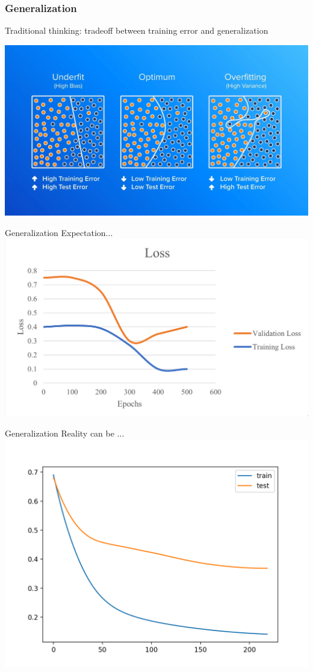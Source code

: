 \documentclass{beamer}   	%
\theoremstyle{definition}
\begin{document}
\begin{frame}
\frametitle{Generalization}
Traditional thinking: tradeoff between training error and generalization

\includegraphics[width=\linewidth]{fit}
\end{frame}

\begin{frame}{Generalization}
Expectation...
\includegraphics[width=\linewidth]{loss_curve_expected.png}
\end{frame}

\begin{frame}{Generalization}
Reality can be ...
\includegraphics[width=\linewidth]{loss_curve}
\end{frame}
\end{document}
